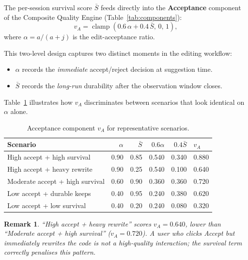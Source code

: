 \documentclass[11pt,a4paper]{article}
\newtheorem{remark}{Remark}
\newcommand{\clamp}[3]{\operatorname{clamp}\!\left(#1,\,#2,\,#3\right)}
\begin{document}
The per-session survival score $\bar{S}$ feeds directly into the
\textbf{Acceptance} component of the Composite Quality Engine
(Table~\ref{tab:components}):
\[
  v_A = \clamp{0.6\,\alpha + 0.4\,\bar{S}}{0}{1},
\]
where $\alpha = a/(a+j)$ is the edit-acceptance ratio.

This two-level design captures two distinct moments in the editing workflow:

\begin{itemize}
  \item $\alpha$ records the \emph{immediate} accept/reject decision at
        suggestion time.
  \item $\bar{S}$ records the \emph{long-run} durability after the
        observation window closes.
\end{itemize}

Table~\ref{tab:acceptance-examples} illustrates how $v_A$ discriminates
between scenarios that look identical on $\alpha$ alone.

\begin{table}[h!]
\centering
\caption{Acceptance component $v_A$ for representative scenarios.}
\label{tab:acceptance-examples}
\begin{tabular}{@{}lrrrrl@{}}
\toprule
Scenario & $\alpha$ & $\bar{S}$ & $0.6\alpha$ & $0.4\bar{S}$ & $v_A$ \\
\midrule
High accept + high survival
  & 0.90 & 0.85 & 0.540 & 0.340 & 0.880 \\
High accept + heavy rewrite
  & 0.90 & 0.25 & 0.540 & 0.100 & 0.640 \\
Moderate accept + high survival
  & 0.60 & 0.90 & 0.360 & 0.360 & 0.720 \\
Low accept + durable keeps
  & 0.40 & 0.95 & 0.240 & 0.380 & 0.620 \\
Low accept + low survival
  & 0.40 & 0.20 & 0.240 & 0.080 & 0.320 \\
\bottomrule
\end{tabular}
\end{table}

\begin{remark}
``High accept + heavy rewrite'' scores $v_A = 0.640$, \emph{lower} than
``Moderate accept + high survival'' ($v_A = 0.720$).  A user who clicks
\emph{Accept} but immediately rewrites the code is not a high-quality
interaction; the survival term correctly penalises this pattern.
\end{remark}

\end{document}
